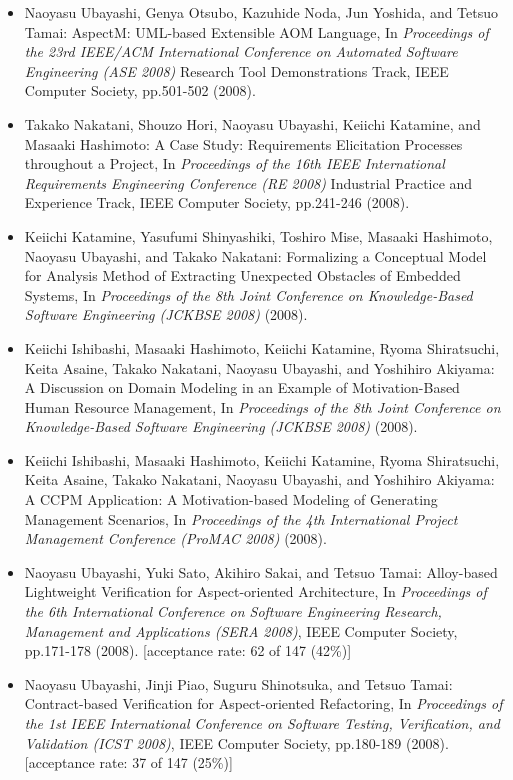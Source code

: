 \documentclass{article}
\begin{document}
\begin{itemize}
\item Naoyasu Ubayashi, Genya Otsubo, Kazuhide Noda, Jun Yoshida, and Tetsuo Tamai:
AspectM: UML-based Extensible AOM Language,
In {\em Proceedings of the 23rd IEEE/ACM International Conference on Automated Software Engineering (ASE 2008)} Research Tool Demonstrations Track,
IEEE Computer Society,
pp.501-502 (2008).

\item Takako Nakatani, Shouzo Hori, Naoyasu Ubayashi, Keiichi Katamine, and Masaaki Hashimoto:
A Case Study: Requirements Elicitation Processes throughout a Project,
In {\em Proceedings of the 16th IEEE International Requirements Engineering Conference (RE 2008)} Industrial Practice and Experience Track,
IEEE Computer Society,
pp.241-246 (2008).

\item Keiichi Katamine, Yasufumi Shinyashiki, Toshiro Mise, Masaaki Hashimoto, Naoyasu Ubayashi, and Takako Nakatani:
Formalizing a Conceptual Model for Analysis Method of Extracting Unexpected Obstacles of Embedded Systems,
In {\em Proceedings of the 8th Joint Conference on Knowledge-Based Software Engineering (JCKBSE 2008)} (2008).

\item Keiichi Ishibashi, Masaaki Hashimoto, Keiichi Katamine, Ryoma Shiratsuchi, Keita Asaine, Takako Nakatani, Naoyasu Ubayashi, and Yoshihiro Akiyama:
A Discussion on Domain Modeling in an Example of Motivation-Based Human Resource Management,
In {\em Proceedings of the 8th Joint Conference on Knowledge-Based Software Engineering (JCKBSE 2008)} (2008).

\item Keiichi Ishibashi, Masaaki Hashimoto, Keiichi Katamine, Ryoma Shiratsuchi, Keita Asaine, Takako Nakatani, Naoyasu Ubayashi, and Yoshihiro Akiyama:
A CCPM Application: A Motivation-based Modeling of Generating Management Scenarios,
In {\em Proceedings of the 4th International Project Management Conference (ProMAC 2008)} (2008).

\item Naoyasu Ubayashi, Yuki Sato, Akihiro Sakai, and Tetsuo Tamai:
Alloy-based Lightweight Verification for Aspect-oriented Architecture,
In {\em Proceedings of the 6th International Conference on Software Engineering Research, Management and Applications (SERA 2008)},
IEEE Computer Society,
pp.171-178 (2008).
[acceptance rate: 62 of 147 (42\%)]

\item Naoyasu Ubayashi, Jinji Piao, Suguru Shinotsuka, and Tetsuo Tamai:
Contract-based Verification for Aspect-oriented Refactoring,
In {\em Proceedings of the 1st IEEE International Conference on Software Testing, Verification, and Validation (ICST 2008)},
IEEE Computer Society,
pp.180-189 (2008).
[acceptance rate: 37 of 147 (25\%)]


\end{itemize}
\end{document}
